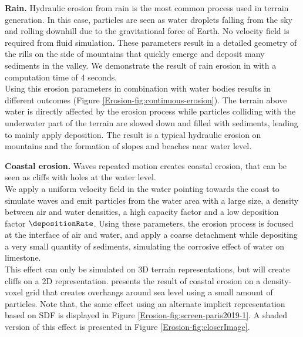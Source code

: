 \textbf{Rain.}
Hydraulic erosion from rain is the most common process used in terrain generation. In this case, particles are seen as water droplets falling from the sky and rolling downhill due to the gravitational force of Earth. No velocity field is required from fluid simulation. These parameters result in a detailed geometry of the rills on the side of mountains that quickly emerge and deposit many sediments in the valley.  
We demonstrate the result of rain erosion in  with a computation time of 4 seconds.  \\
Using this erosion parameters in combination with water bodies results in different outcomes (Figure \ref{Erosion-fig:continuous-erosion}). The terrain above water is directly affected by the erosion process while particles colliding with the underwater part of the terrain are slowed down and filled with sediments, leading to mainly apply deposition. The result is a typical hydraulic erosion on mountains and the formation of slopes and beaches near water level.

\textbf{Coastal erosion.}
Waves repeated motion  creates coastal erosion, that can be seen as cliffs with holes at the water level. \\
We apply a uniform velocity field in the water pointing towards the coast to simulate waves and emit particles from the water area with a large size, a density between air and water densities, a high capacity factor and a low deposition factor $\depositionRate$. Using these parameters, the erosion process is focused at the interface of air and water, and apply a coarse detachment while depositing a very small quantity of sediments, simulating the corrosive effect of water on limestone. \\ 
This effect can only be simulated on 3D terrain representations, but will create cliffs on a 2D representation. 
 presents the result of coastal erosion on a density-voxel grid that creates overhangs around sea level using a small amount of particles. Note that, the same effect using an alternate implicit representation based on SDF is displayed in Figure \ref{Erosion-fig:screen-paris2019-1}.
A shaded version of this effect is presented in Figure \ref{Erosion-fig:closerImage}.

